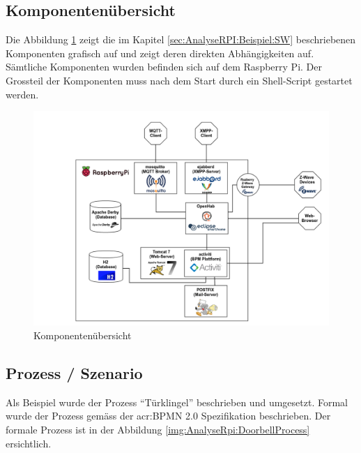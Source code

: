 \begin{itemize}

\end{itemize}


\subsection{Komponentenübersicht}
Die Abbildung \ref{img:AnalyseRpi:ComponentOverview}  zeigt die im Kapitel \ref{sec:AnalyseRPI:Beispiel:SW}  beschriebenen Komponenten grafisch auf und zeigt deren direkten Abhängigkeiten auf. Sämtliche Komponenten wurden befinden sich auf dem Raspberry Pi. Der Grossteil der Komponenten muss nach dem Start durch ein Shell-Script gestartet werden.

\begin{landscape}
\begin{figure}[H]
  \centering
  \includegraphics[width=19cm]{./images/Component-Overview}
  \caption{Komponentenübersicht}\label{img:AnalyseRpi:ComponentOverview}
\end{figure}
\end{landscape}

\subsection{Prozess / Szenario}
Als Beispiel wurde der Prozess "`Türklingel"' beschrieben und umgesetzt. Formal wurde der Prozess gemäss der \gls{acr:BPMN} 2.0 Spezifikation beschrieben. Der formale Prozess ist in der Abbildung \ref{img:AnalyseRpi:DoorbellProcess}  ersichtlich.

